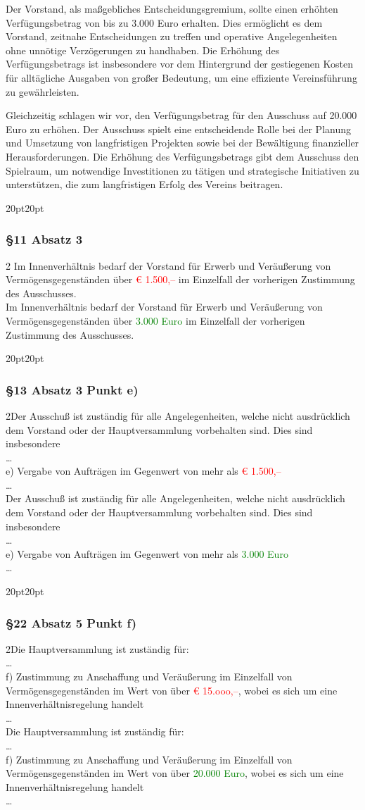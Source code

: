 \documentclass[10pt,a4paper,parskip=half]{scrartcl}
\newcommand{\new}[1]{\textcolor{Green}{#1}}
\newcommand{\old}[1]{\textcolor{Red}{#1}}
\newcommand{\change}[1]{
  \begin{adjustwidth}{20pt}{20pt}
    #1
  \end{adjustwidth}
}
\newcommand{\compare}[3]{\change{\subsubsection*{#1}\begin{multicols}{2}#2\columnbreak\\#3\end{multicols}}}
\begin{document}
Der Vorstand, als maßgebliches Entscheidungsgremium, sollte einen erhöhten Verfügungsbetrag von bis zu 3.000 Euro erhalten. Dies ermöglicht es dem Vorstand, zeitnahe Entscheidungen zu treffen und operative Angelegenheiten ohne unnötige Verzögerungen zu handhaben. Die Erhöhung des Verfügungsbetrags ist insbesondere vor dem Hintergrund der gestiegenen Kosten für alltägliche Ausgaben von großer Bedeutung, um eine effiziente Vereinsführung zu gewährleisten.

Gleichzeitig schlagen wir vor, den Verfügungsbetrag für den Ausschuss auf 20.000 Euro zu erhöhen. Der Ausschuss spielt eine entscheidende Rolle bei der Planung und Umsetzung von langfristigen Projekten sowie bei der Bewältigung finanzieller Herausforderungen. Die Erhöhung des Verfügungsbetrags gibt dem Ausschuss den Spielraum, um notwendige Investitionen zu tätigen und strategische Initiativen zu unterstützen, die zum langfristigen Erfolg des Vereins beitragen.

\compare{§11 Absatz 3}{
  Im Innenverhältnis bedarf der Vorstand für Erwerb und Veräußerung von Vermögensgegenständen über \old{€ 1.500,--} im Einzelfall der vorherigen Zustimmung des Ausschusses.
}{Im Innenverhältnis bedarf der Vorstand für Erwerb und Veräußerung von Vermögensgegenständen über \new{3.000 Euro} im Einzelfall der vorherigen Zustimmung des Ausschusses.}

\compare{§13 Absatz 3 Punkt e)}
{Der Ausschuß ist zuständig für alle Angelegenheiten, welche nicht ausdrücklich dem
  Vorstand oder der Hauptversammlung vorbehalten sind. Dies sind insbesondere\\\dots\\
  e) Vergabe von Aufträgen im Gegenwert von mehr als \old{€ 1.500,--}\\\dots}
{Der Ausschuß ist zuständig für alle Angelegenheiten, welche nicht ausdrücklich dem
  Vorstand oder der Hauptversammlung vorbehalten sind. Dies sind insbesondere\\\dots\\
  e) Vergabe von Aufträgen im Gegenwert von mehr als \new{3.000 Euro}\\\dots}

\clearpage
\compare{§22 Absatz 5 Punkt f)}
{Die Hauptversammlung ist zuständig für: \\ \dots\\
  f) Zustimmung zu Anschaffung und Veräußerung im Einzelfall von Vermögensgegenständen im Wert von über \old{€ 15.ooo,--}, wobei es sich um eine Innenverhältnisregelung handelt\\\dots}
{Die Hauptversammlung ist zuständig für: \\ \dots\\f) Zustimmung zu Anschaffung und Veräußerung im Einzelfall von Vermögensgegenständen im Wert von über \new{20.000 Euro}, wobei es sich um eine Innenverhältnisregelung handelt\\\dots}
\end{document}
